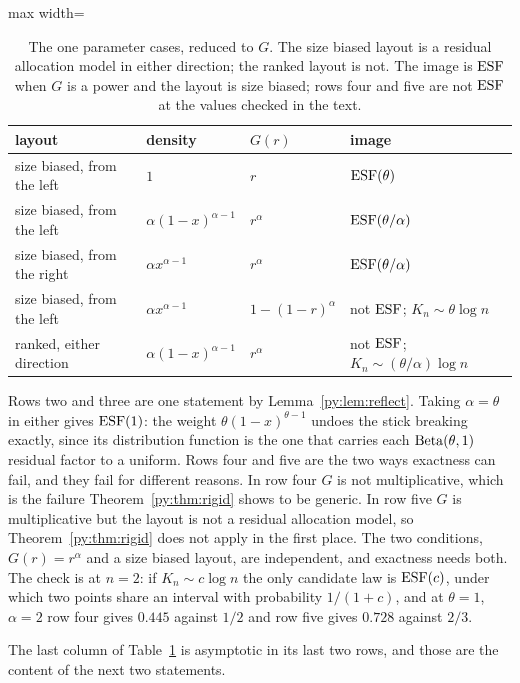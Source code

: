 \begin{table}[t]
\centering
\caption{The one parameter cases, reduced to $G$. The size biased layout is a residual allocation
model in either direction; the ranked layout is not. The image is $\mathrm{ESF}$ when $G$ is a power and
the layout is size biased; rows four and five are not $\mathrm{ESF}$ at the values checked in the text.}
\label{py:tab:onepar}
\small
\begin{adjustbox}{max width=\textwidth}
\begin{tabular}{llll}
\toprule
layout & density & $G(r)$ & image \\
\midrule
size biased, from the left & $1$ & $r$ & $\mathrm{ESF}(\theta)$ \\
size biased, from the left & $\alpha(1-x)^{\alpha-1}$ & $r^{\alpha}$ & $\mathrm{ESF}(\theta/\alpha)$ \\
size biased, from the right & $\alpha x^{\alpha-1}$ & $r^{\alpha}$ & $\mathrm{ESF}(\theta/\alpha)$ \\
size biased, from the left & $\alpha x^{\alpha-1}$ & $1-(1-r)^{\alpha}$ & not $\mathrm{ESF}$; $K_n \sim \theta\log n$ \\
ranked, either direction & $\alpha(1-x)^{\alpha-1}$ & $r^{\alpha}$ &
  not $\mathrm{ESF}$; $K_n \sim (\theta/\alpha)\log n$ \\
\bottomrule
\end{tabular}
\end{adjustbox}
\end{table}

Rows two and three are one statement by Lemma~\ref{py:lem:reflect}. Taking $\alpha = \theta$ in either
gives $\mathrm{ESF}(1)$: the weight $\theta(1-x)^{\theta-1}$ undoes the stick breaking exactly, since its
distribution function is the one that carries each $\mathrm{Beta}(\theta,1)$ residual factor to a uniform.
Rows four and five are the two ways exactness can fail, and they fail for different reasons. In row
four $G$ is not multiplicative, which is the failure Theorem~\ref{py:thm:rigid} shows to be generic. In
row five $G$ is multiplicative but the layout is not a residual allocation model, so
Theorem~\ref{py:thm:rigid} does not apply in the first place. The two conditions, $G(r) = r^{\alpha}$
and a size biased layout, are independent, and exactness needs both. The check is at $n = 2$: if
$K_n \sim c\log n$ the only candidate law is $\mathrm{ESF}(c)$, under which two points share an interval
with probability $1/(1+c)$, and at $\theta = 1$, $\alpha = 2$ row four gives $0.445$ against $1/2$
and row five gives $0.728$ against $2/3$.

The last column of Table~\ref{py:tab:onepar} is asymptotic in its last two rows, and those are the
content of the next two statements.

